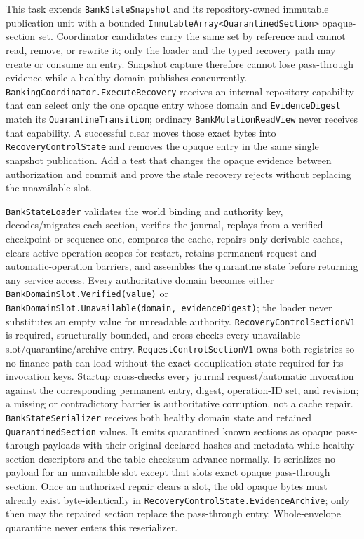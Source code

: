 \documentclass[
  10pt,
  letterpaper,
]{article}
\newcommand{\passthrough}[1]{#1}
\begin{document}
This task extends \passthrough{\lstinline!BankStateSnapshot!} and its
repository-owned immutable publication unit with a bounded
\texttt{ImmutableArray\textless{}}\allowbreak{}\texttt{QuarantinedSection\textgreater{}}\allowbreak{}
opaque-section set. Coordinator candidates carry the same set by
reference and cannot read, remove, or rewrite it; only the loader and
the typed recovery path may create or consume an entry. Snapshot capture
therefore cannot lose pass-through evidence while a healthy domain
publishes concurrently.
\texttt{BankingCoordinator.}\allowbreak{}\texttt{ExecuteRecovery}
receives an internal repository capability that can select only the one
opaque entry whose domain and \passthrough{\lstinline!EvidenceDigest!}
match its \passthrough{\lstinline!QuarantineTransition!}; ordinary
\passthrough{\lstinline!BankMutationReadView!} never receives that
capability. A successful clear moves those exact bytes into
\passthrough{\lstinline!RecoveryControlState!} and removes the opaque
entry in the same single snapshot publication. Add a test that changes
the opaque evidence between authorization and commit and prove the stale
recovery rejects without replacing the unavailable slot.

\passthrough{\lstinline!BankStateLoader!} validates the world binding
and authority key, decodes/migrates each section, verifies the journal,
replays from a verified checkpoint or sequence one, compares the cache,
repairs only derivable caches, clears active operation scopes for
restart, retains permanent request and automatic-operation barriers, and
assembles the quarantine state before returning any service access.
Every authoritative domain becomes either
\texttt{BankDomainSlot.}\allowbreak{}\texttt{Verified(}\allowbreak{}\texttt{value)}\allowbreak{}
or
\texttt{BankDomainSlot.}\allowbreak{}\texttt{Unavailable(}\allowbreak{}\texttt{domain,}\allowbreak{}\texttt{\ }\allowbreak{}\texttt{evidenceDigest)}\allowbreak{};
the loader never substitutes an empty value for unreadable authority.
\texttt{RecoveryControlSectionV1} is required, structurally bounded, and
cross-checks every unavailable
slot/\allowbreak{}quarantine/\allowbreak{}archive entry.
\passthrough{\lstinline!RequestControlSectionV1!} owns both registries
so no finance path can load without the exact deduplication state
required for its invocation keys. Startup cross-checks every journal
request/automatic invocation against the corresponding permanent entry,
digest, operation-ID set, and revision; a missing or contradictory
barrier is authoritative corruption, not a cache repair.
\passthrough{\lstinline!BankStateSerializer!} receives both healthy
domain state and retained \passthrough{\lstinline!QuarantinedSection!}
values. It emits quarantined known sections as opaque pass-through
payloads with their original declared hashes and metadata while healthy
section descriptors and the table checksum advance normally. It
serializes no payload for an unavailable slot except that
slot\textquotesingle s exact opaque pass-through section. Once an
authorized repair clears a slot, the old opaque bytes must already exist
byte-identically in
\texttt{RecoveryControlState.}\allowbreak{}\texttt{EvidenceArchive};
only then may the repaired section replace the pass-through entry.
Whole-envelope quarantine never enters this reserializer.
\end{document}
